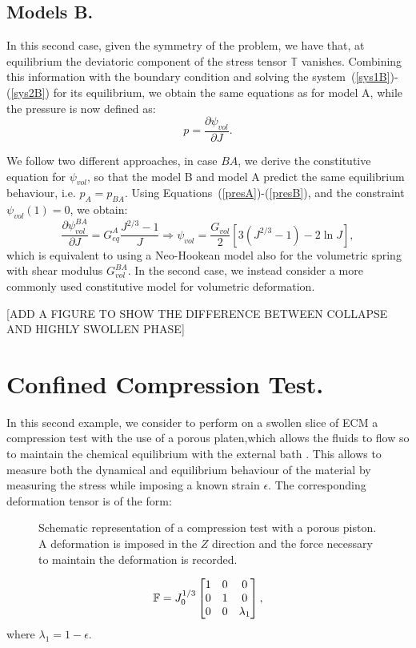\subsection{Models B.}
In this second case, given the symmetry of the problem, we have that, at equilibrium the deviatoric component of the stress tensor $\mathbb{T}$ vanishes. Combining this information with the boundary condition and solving the system~(\ref{sys1B})-(\ref{sys2B}) for its equilibrium, we obtain the same equations as for model A, while the pressure is now defined as:
\begin{equation}
p = \frac{\partial \psi_{vol}}{\partial J} .\label{presB}%
\end{equation}

We follow two different approaches, in case $BA$, we derive the constitutive equation for $\psi_{vol}$, so that the model B and model A predict the same equilibrium behaviour, i.e. $p_A=p_{BA}$. Using Equations~(\ref{presA})-(\ref{presB}), and the constraint $\psi_{vol}(1)=0$, we obtain:
\begin{equation}
\frac{\partial \psi^{BA}_{vol}}{\partial J}= G^A_{eq} \frac{J^{2/3}-1}{J} \Longrightarrow \psi_{vol} = \frac{G_{vol}}{2}\left[3(J^{2/3} -1) - 2\ln J\right],
\end{equation}
which is equivalent to using a Neo-Hookean model also for the volumetric spring with shear modulus $G^{BA}_{vol}$. In the second case, we instead consider a more commonly used constitutive model for volumetric deformation. 

[ADD A FIGURE TO SHOW THE DIFFERENCE BETWEEN COLLAPSE AND HIGHLY SWOLLEN PHASE]
\section{Confined Compression Test.}

In this second example, we consider to perform on a swollen slice of ECM a compression test with the use of a porous platen,which allows the fluids to flow so to maintain the chemical equilibrium with the external bath \cite{Netti}. This allows to measure both the dynamical and equilibrium behaviour of the material by measuring the stress while imposing a known strain $\epsilon$. The corresponding deformation tensor is of the form:

\begin{figure}[h]
	\centering
	\def\svgwidth{0.89\linewidth}
	
	\vspace{2mm}
	\caption{Schematic representation of a compression test with a porous piston. A deformation is imposed in the $Z$ direction and the force necessary to maintain the deformation is recorded. }
\end{figure}
\begin{equation}
\mathbb{F}=J_0^{1/3}\begin{bmatrix}
1 &0&0\\
0&1&0\\
0&0& \lambda_1
\end{bmatrix},
\label{F} 
\end{equation}
where $\lambda_1 = 1 - \epsilon$. 

